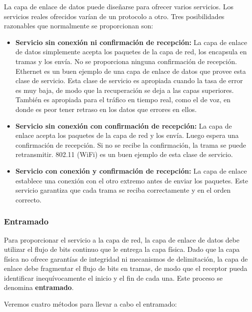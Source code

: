 La capa de enlace de datos puede diseñarse para ofrecer varios servicios. Los servicios reales ofrecidos varían de un protocolo a otro. Tres posibilidades razonables que normalmente se proporcionan son:

\begin{itemize}
  \item \textbf{Servicio sin conexión ni confirmación de recepción:} La capa de enlace de datos simplemente acepta los paquetes de la capa de red, los encapsula en tramas y los envía. No se proporciona ninguna confirmación de recepción. Ethernet es un buen ejemplo de una capa de enlace de datos que provee esta clase de servicio. Esta clase de servicio es apropiada cuando la tasa de error es muy baja, de modo que la recuperación se deja a las capas superiores. También es apropiada para el tráfico en tiempo real, como el de voz, en donde es peor tener retraso en los datos que errores en ellos.
  \item \textbf{Servicio sin conexión con confirmación de recepción:} La capa de enlace acepta los paquetes de la capa de red y los envía. Luego espera una confirmación de recepción. Si no se recibe la confirmación, la trama se puede retransmitir. 802.11 (WiFi) es un buen ejemplo de esta clase de servicio.
  \item \textbf{Servicio con conexión y confirmación de recepción:} La capa de enlace establece una conexión con el otro extremo antes de enviar los paquetes. Este servicio garantiza que cada trama se reciba correctamente y en el orden correcto. 
\end{itemize}

\subsubsection{Entramado}

Para proporcionar el servicio a la capa de red, la capa de enlace de datos debe utilizar el flujo de bits continuo que le entrega la capa física. Dado que la capa física no ofrece garantías de integridad ni mecanismos de delimitación, la capa de enlace debe fragmentar el flujo de bits en tramas, de modo que el receptor pueda identificar inequívocamente el inicio y el fin de cada una. Este proceso se denomina \textbf{entramado}.

Veremos cuatro métodos para llevar a cabo el entramado:

